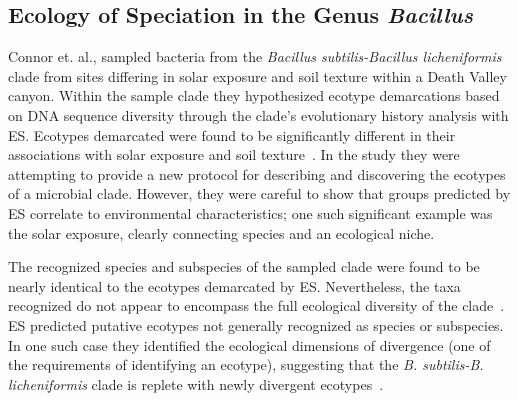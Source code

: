 \subsection*{Ecology of Speciation in the Genus \emph{Bacillus}}
Connor et. al., sampled bacteria from the \emph{Bacillus subtilis-Bacillus licheniformis} clade from sites differing in solar exposure and soil texture within a Death Valley canyon.
Within the sample clade they hypothesized ecotype demarcations based on DNA sequence diversity through the clade's evolutionary history analysis with ES.
Ecotypes demarcated were found to be significantly different in their associations with solar exposure and soil texture~\cite{connor2010ecology}.
In the study they were attempting to provide a new protocol for describing and discovering the ecotypes of a microbial clade.
However, they were careful to show that groups predicted by ES correlate to environmental characteristics; one such significant example was the solar exposure, clearly connecting species and an ecological niche.

The recognized species and subspecies of the sampled clade were found to be nearly identical to the ecotypes demarcated by ES.
Nevertheless, the taxa recognized do not appear to encompass the full ecological diversity of the clade~\cite{connor2010ecology}.
ES predicted putative ecotypes not generally recognized as species or subspecies.
In one such case they identified the ecological dimensions of divergence (one of the requirements of identifying an ecotype), suggesting that the \emph{B. subtilis-B. licheniformis} clade is replete with newly divergent ecotypes~\cite{connor2010ecology}.

